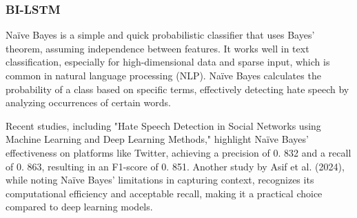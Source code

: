 \subsubsection{BI-LSTM}

\noindent
Naïve Bayes is a simple and quick probabilistic classifier that uses Bayes' theorem, assuming independence between features. It works well in text classification, especially for high-dimensional data and sparse input, which is common in natural language processing (NLP). Naïve Bayes calculates the probability of a class based on specific terms, effectively detecting hate speech by analyzing occurrences of certain words.

Recent studies, including "Hate Speech Detection in Social Networks using Machine Learning and Deep Learning Methods," highlight Naïve Bayes' effectiveness on platforms like Twitter, achieving a precision of 0. 832 and a recall of 0. 863, resulting in an F1-score of 0. 851. Another study by Asif et al. (2024), while noting Naïve Bayes' limitations in capturing context, recognizes its computational efficiency and acceptable recall, making it a practical choice compared to deep learning models.